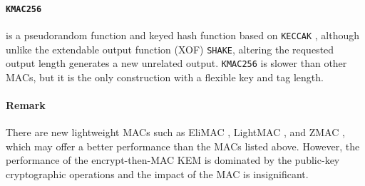 \documentclass[runningheads]{llncs}
\begin{document}
\paragraph{\texttt{KMAC256} \cite{NIST800185}} is a pseudorandom function and keyed hash function based on \texttt{KECCAK} \cite{NISTFIPS202}, although unlike the extendable output function (XOF) \texttt{SHAKE}, altering the requested output length generates a new unrelated output. \texttt{KMAC256} is slower than other MACs, but it is the only construction with a flexible key and tag length.

\paragraph{Remark} There are new lightweight MACs such as EliMAC \cite{DBLP:journals/tosc/DobraunigMN23}, LightMAC \cite{DBLP:conf/fse/LuykxPTY16}, and ZMAC \cite{DBLP:conf/crypto/IwataMPS17}, which may offer a better performance than the MACs listed above. However, the performance of the encrypt-then-MAC KEM is dominated by the public-key cryptographic operations and the impact of the MAC is insignificant.
\end{document}
